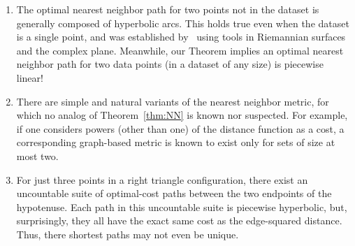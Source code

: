 \begin{enumerate}

\item The optimal nearest neighbor path for two points not in the dataset
is generally composed of hyperbolic arcs.
This holds true even when the dataset is a single point, and was established by~\cite{cohen15approximating} using tools in Riemannian surfaces and the complex plane.
Meanwhile, our Theorem implies an optimal nearest neighbor path for two
data points (in a dataset of any size) is piecewise linear!

\item There are simple and natural variants of the nearest neighbor metric, for which no analog of Theorem~\ref{thm:NN} is known nor suspected.
For example, if one considers powers (other than one) of the distance function as a cost, a corresponding graph-based metric is known to exist only for sets of size at most two.

\item For just three points in a right triangle configuration, there exist an uncountable suite of optimal-cost paths between the two endpoints of the hypotenuse.
Each path in this uncountable suite is piecewise hyperbolic, but, surprisingly, they all have the exact same cost as the edge-squared distance.
Thus, there shortest paths may not even be unique.


\end{enumerate}
